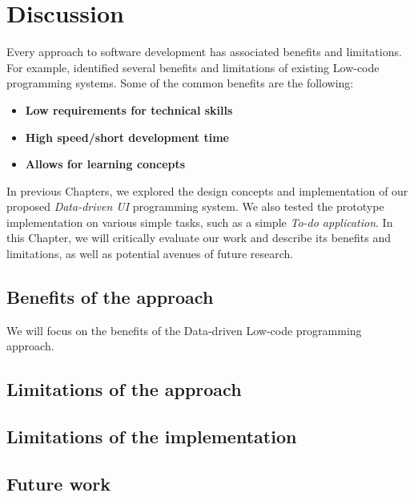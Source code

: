 \chapter{Discussion}
\label{chap:discussion}

Every approach to software development has associated benefits and limitations.
For example, \citet{Pinho_Aguiar_Amaral_2023} identified several benefits and limitations of existing Low-code programming systems.
Some of the common benefits are the following:
\begin{itemize}
	\item \textbf{Low requirements for technical skills}
	\item \textbf{High speed/short development time}
	\item \textbf{Allows for learning concepts}
\end{itemize}



In previous Chapters, we explored the design concepts and implementation of our proposed \emph{Data-driven UI} programming system.
We also tested the prototype implementation on various simple tasks, such as a simple \emph{To-do application}.
In this Chapter, we will critically evaluate our work and describe its benefits and limitations, as well as potential avenues of future research.


\section{Benefits of the approach}

We will focus on the benefits of the Data-driven Low-code programming approach.

\section{Limitations of the approach}

\section{Limitations of the implementation}

\section{Future work}

